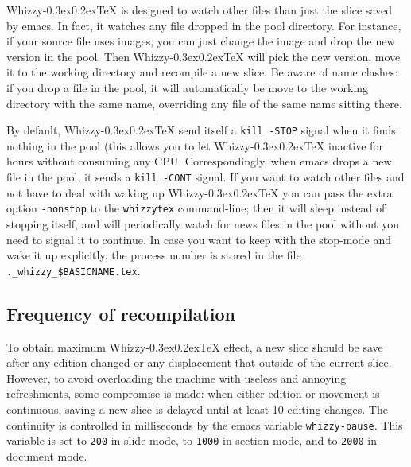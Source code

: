 \documentclass{article}
\let \lst \verb
\def \whizzy{{Whizzy\kern -0.3ex\raise 0.2ex\hbox{\TeX}}}
\begin{document}
{\whizzy} is designed to watch other files than just the slice saved by
emacs. In fact, it watches any file dropped in the pool directory. 
For instance, 
if your source file uses images, you can just change the image and
drop the new version in the pool. Then {\whizzy} will pick the new version,
move it to the working directory and recompile a new slice. Be aware of name
clashes: if you drop a file in the pool, it will automatically be move to
the working directory with the same name, overriding any file of the same
name sitting there. 

By default, {\whizzy} send itself a \lst"kill -STOP" signal when it finds
nothing in the pool (this allows you to let {\whizzy} inactive for hours
without consuming any CPU. Correspondingly, when emacs drops a new file in
the pool, it sends a \lst"kill -CONT" signal. If you want to watch other
files and not have to deal with waking up {\whizzy} you can pass the extra
option \lst"-nonstop" to the \lst"whizzytex" command-line; then it will sleep
instead of stopping itself, and will periodically watch for news files 
in the pool without you need to signal it to continue. 
In case you want to keep with the stop-mode and wake it up explicitly, the
process number is stored in the file \lst"._whizzy_$BASICNAME.tex".


\subsection {Frequency of recompilation} 

To obtain maximum {\whizzy} effect, a new slice should be save after any
edition changed or any displacement that outside of the current slice.
However, to avoid overloading the machine with useless and annoying
refreshments, some compromise is made: when either edition or movement
is continuous, saving a new slice is delayed until at least 10 editing
changes. The continuity is controlled in milliseconds by the emacs variable
\lst"whizzy-pause". This variable is set to \lst"200" in slide
mode, to \lst"1000" in section mode, and to \lst"2000" in document mode.
\end{document}
